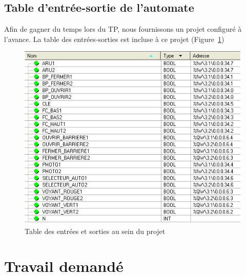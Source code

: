 \documentclass[11pt, multicol]{article}
\begin{document}
\subsection{Table d'entrée-sortie de l'automate}
Afin de gagner du temps lors du TP, nous fournissons un projet configuré à l'avance. La table des entrées-sorties est incluse à ce projet (Figure~\ref{fig:entreesSorties})
\begin{figure}
	\centering
	\includegraphics[width=.9\textwidth]{images/listeES}
	\caption{Table des entrées et sorties au sein du projet}
	\label{fig:entreesSorties}
\end{figure}
\pagebreak
\section{Travail demandé}
\end{document}
